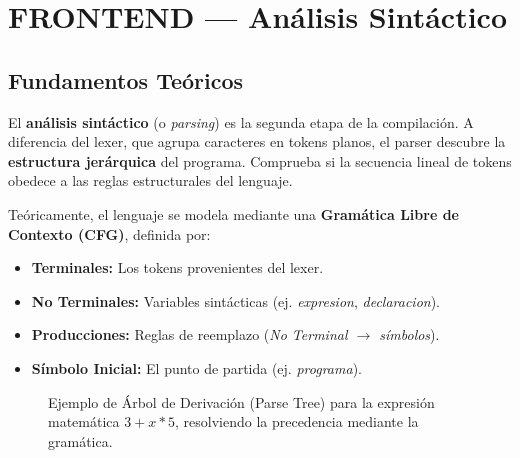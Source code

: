 \chapter{FRONTEND — Análisis Sintáctico}

\section{Fundamentos Teóricos}

El \textbf{análisis sintáctico} (o \textit{parsing}) es la segunda etapa de la compilación. A diferencia del lexer, que agrupa caracteres en tokens planos, el parser descubre la \textbf{estructura jerárquica} del programa. Comprueba si la secuencia lineal de tokens obedece a las reglas estructurales del lenguaje.

Teóricamente, el lenguaje se modela mediante una \textbf{Gramática Libre de Contexto (CFG)}, definida por:
\begin{itemize}
    \item \textbf{Terminales:} Los tokens provenientes del lexer.
    \item \textbf{No Terminales:} Variables sintácticas (ej. \textit{expresion}, \textit{declaracion}).
    \item \textbf{Producciones:} Reglas de reemplazo (\textit{No Terminal $\rightarrow$ símbolos}).
    \item \textbf{Símbolo Inicial:} El punto de partida (ej. \textit{programa}).
\end{itemize}

\begin{figure}[H]
    \centering
    \caption{Ejemplo de Árbol de Derivación (Parse Tree) para la expresión matemática $3 + x * 5$, resolviendo la precedencia mediante la gramática.}
    \label{fig:parse_tree}
\end{figure}

